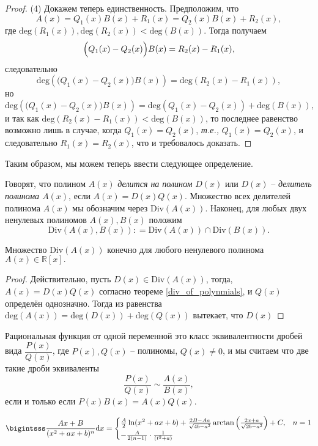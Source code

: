 \begin{proof}
(4) Докажем теперь единственность. Предположим, что
\[
 A(x)  = Q_1(x) B(x) + R_1(x) =  Q_2(x) B(x) + R_2(x),
\]
где $\mathrm{deg}(R_1(x)), \mathrm{deg}(R_2(x)) < \mathrm{deg}(B(x))$. Тогда получаем
\[
\Bigl(Q_1(x) - Q_2(x)\Bigr) B(x) = R_2(x) - R_1(x),
\]
следовательно
\[
 \mathrm{deg}\left((Q_1(x) - Q_2(x)\Bigr) B(x) \right) = \mathrm{deg}(R_2(x) -R_1(x)),
\]
но
\[
 \mathrm{deg}\left((Q_1(x) - Q_2(x)\Bigr) B(x) \right) = \mathrm{deg}(Q_1(x) - Q_2(x)) + \mathrm{deg}(B(x)),
\]
и так как $\mathrm{deg}(R_2(x) - R_1(x)) < \mathrm{deg}(B(x))$, то последнее равенство возможно лишь в случае, когда $Q_1(x) = Q_2(x)$, \textit{т.е.,} $Q_1(x) = Q_2(x)$, и следовательно $R_1(x) = R_2(x)$, что и требовалось доказать.
\end{proof}

Таким образом, мы можем теперь ввести следующее определение.

\begin{definition}
    Говорят, что полином $A(x)$ \textit{делится на полином} $D(x)$ или $D(x)$ -- \textit{делитель полинома $A(x)$}, если $A(x) = D(x)Q(x)$. Множество всех делителей полинома $A(x)$ мы обозначим через $\mathrm{Div}(A(x)).$ Наконец, для любых двух ненулевых полиномов $A(x), B(x)$ положим 
    $$
    \mathrm{Div}(A(x),B(x)): = \mathrm{Div}(A(x)) \cap \mathrm{Div}(B(x)).
    $$
\end{definition}



\begin{lemma}
    Множество $\mathrm{Div}(A(x))$ конечно для любого ненулевого полинома $A(x) \in \mathbb{R}[x].$
\end{lemma}
\begin{proof}
    Действительно, пусть $D(x) \in \mathrm{Div}(A(x))$, тогда, $A(x) = D(x)Q(x)$ согласно теореме \ref{div_of_polynmials}, и $Q(x)$ определён однозначно. Тогда из равенства $\mathrm{deg}(A(x))=  \mathrm{deg}(D(x)) + \mathrm{deg}(Q(x))$ вытекает, что $D(x)$
\end{proof}




\begin{definition}
    Рациональная функция от одной переменной это класс эквивалентности дробей вида $\dfrac{P(x)}{Q(x)}$, где $P(x), Q(x)$ -- полиномы, $Q(x) \ne 0$, и мы считаем что две такие дроби эквиваленты
    \[
     \frac{P(x)}{Q(x)} \sim \frac{A(x)}{B(x)},
    \]
    если и только если $P(x) B(x) = A(x) Q(x).$
\end{definition}

  \[
   \bigintsss \frac{Ax + B}{(x^2 + ax + b)^n}\mathrm{d}x = \begin{cases}
       \frac{A}{2}\ln(x^2 + ax + b) + \frac{2B-Aa}{\sqrt{4b-a^2}}\arctan\left( \frac{2x+a}{\sqrt{2b-a^2}} \right) + C, & n=1 \\
       - \frac{A}{2(n-1)}\cdot \frac{1}{(t^2 + a)}
   \end{cases}
  \]





